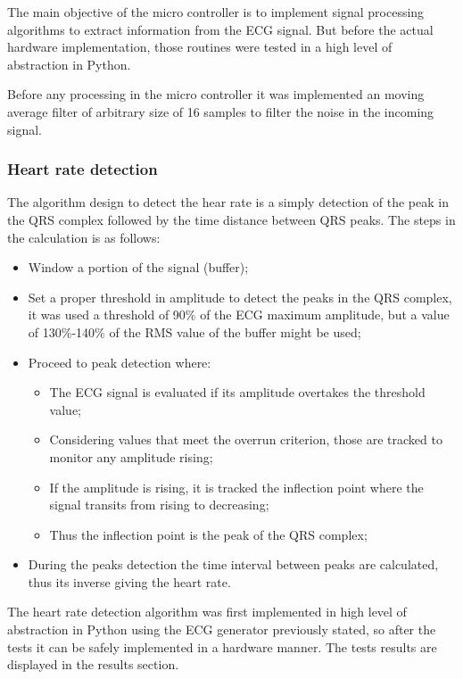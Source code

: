 The main objective of the micro controller is to implement signal processing algorithms to extract information from the ECG signal. But before the actual hardware implementation, those routines were tested in a high level of abstraction in Python.

Before any processing in the micro controller it was implemented an moving average filter of arbitrary size of 16 samples to filter the noise in the incoming signal. 

\subsubsection{Heart rate detection}

The algorithm design to detect the hear rate is a simply detection of the peak in the QRS complex followed by the time distance between QRS peaks. The steps in the calculation is as follows:

\begin{itemize}
    \item Window a portion of the signal (buffer);
    \item Set a proper threshold in amplitude to detect the peaks in the QRS complex, it was used a threshold of 90\% of the ECG maximum amplitude, but a value of 130\%-140\% of the RMS value of the buffer might be used;
    \item Proceed to peak detection where:
    \begin{itemize}
        \item The ECG signal is evaluated if its amplitude overtakes the threshold value;
        \item Considering values that meet the overrun criterion, those are tracked to monitor any amplitude rising;
        \item If the amplitude is rising, it is tracked the inflection point where the signal transits from rising to decreasing;
        \item Thus the inflection point is the peak of the QRS complex;
    \end{itemize}
    \item During the peaks detection the time interval between peaks are calculated, thus its inverse giving the heart rate.
\end{itemize}

The heart rate detection algorithm was first implemented in high level of abstraction in Python using the ECG generator previously stated, so after the tests it can be safely implemented in a hardware manner. The tests results are displayed in the results section.

